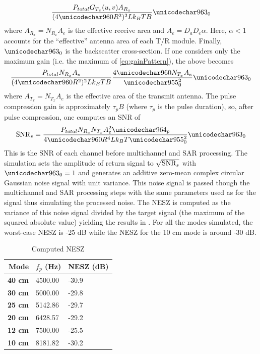 \begin{equation}
 \frac{P_{total}G_{T_x}(u,v)A_{R_x}}{(4\pi R^2)^2Lk_BTB}\crossSection
\end{equation}
where $A_{R_x}=N_{R_x}A_e$ is the effective receive area and $A_e=D_aD_e\alpha$. Here, $\alpha<1$ accounts for the ``effective'' antenna area of each T/R module. Finally, $\crossSection$ is the backscatter cross-section. If one considers only the maximum gain (i.e. the maximum of \eqref{eq:gainPattern}), the above becomes
\begin{equation}
 \frac{P_{total}N_{R_x}A_e}{(4\pi R^2)^2Lk_BTB}\frac{4\pi N_{T_x}A_e}{\lambda_0^2}\crossSection
\end{equation}
where $A_{T_x}=N_{T_x}A_e$ is the effective area of the transmit antenna. The pulse compression gain is approximately $\tau_pB$ (where $\tau_p$ is the pulse duration), so, after pulse compression, one computes an SNR of
\begin{equation}
 \SNR_s = \frac{P_{total}N_{R_x}N_{T_x}A_e^2\tau_p}{4\pi R^4 Lk_BT\lambda_0^2}\crossSection
 \label{eq:pulseCompBeamFormedSNR}
\end{equation}
This is the SNR of each channel before multichannel and SAR processing. The simulation sets the amplitude of return signal to $\sqrt{\text{SNR}_s}$ with $\crossSection=1$ and generates an additive zero-mean complex circular Gaussian noise signal with unit variance. This noise signal is passed though the multichannel and SAR processing steps with the same parameters used as for the signal thus simulating the processed noise. The NESZ is computed as the variance of this noise signal divided by the target signal (the maximum of the squared absolute value) yielding the results in . For all the modes simulated, the worst-case NESZ is -25 dB while the NESZ for the 10 cm mode is around -30 dB.
\begin{table}[ht!]
\begin{center}
 \caption{Computed NESZ}
 \label{tb:nesz}
 \begin{tabular}{r|l|l}
 {\bf Mode} & {\bf $f_p$} (Hz)& {\bf NESZ} (dB)\\\hline
 {\bf 40 cm} & 4500.00 & -30.9\\\hline
 {\bf 30 cm} & 5000.00 & -29.8\\\hline
 {\bf 25 cm} & 5142.86 & -29.7\\\hline
 {\bf 20 cm} & 6428.57 & -29.2\\\hline
 {\bf 12 cm} & 7500.00 & -25.5\\\hline
 {\bf 10 cm} & 8181.82 & -30.2\\\hline
 \end{tabular}
 \end{center}
\end{table}
